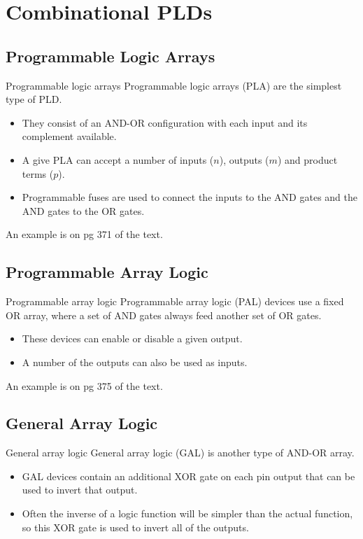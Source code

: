 \section{Combinational PLDs}

\subsection{Programmable Logic Arrays}

\begin{frame}{Programmable logic arrays}
  Programmable logic arrays (PLA) are the simplest type of PLD.
  \begin{itemize}
    \item They consist of an AND-OR configuration with each input and its complement available.
    \item A give PLA can accept a number of inputs ($n$), outputs ($m$) and product terms ($p$).
    \item Programmable fuses are used to connect the inputs to the AND gates and the AND gates to the OR gates.
  \end{itemize}
\end{frame}

An example is on pg 371 of the text.

\subsection{Programmable Array Logic}

\begin{frame}{Programmable array logic}
  Programmable array logic (PAL) devices use a fixed OR array, where a set of AND gates always feed another set of OR gates.
  \begin{itemize}
    \item These devices can enable or disable a given output.
    \item A number of the outputs can also be used as inputs.
  \end{itemize}
\end{frame}

An example is on pg 375 of the text.

\subsection{General Array Logic}

\begin{frame}{General array logic}
  General array logic (GAL) is another type of AND-OR array.
  \begin{itemize}
    \item GAL devices contain an additional XOR gate on each pin output that can be used to invert that output.
    \item Often the inverse of a logic function will be simpler than the actual function, so this XOR gate is used to invert all of the outputs.
  \end{itemize}
\end{frame}

